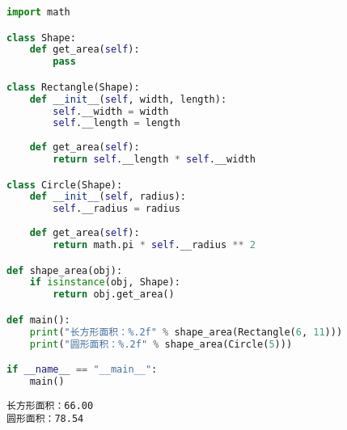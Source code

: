 
\begin{lstlisting}[language=Python]
import math

class Shape:
    def get_area(self):
        pass

class Rectangle(Shape):
    def __init__(self, width, length):
        self.__width = width
        self.__length = length
    
    def get_area(self):
        return self.__length * self.__width

class Circle(Shape):
    def __init__(self, radius):
        self.__radius = radius
    
    def get_area(self):
        return math.pi * self.__radius ** 2

def shape_area(obj):
    if isinstance(obj, Shape):
        return obj.get_area()

def main():
    print("长方形面积：%.2f" % shape_area(Rectangle(6, 11)))
    print("圆形面积：%.2f" % shape_area(Circle(5)))

if __name__ == "__main__":
    main()
\end{lstlisting}

\begin{tcolorbox}
	\begin{verbatim}
长方形面积：66.00
圆形面积：78.54
\end{verbatim}
\end{tcolorbox}

\newpage